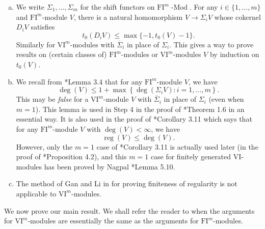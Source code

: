 \documentclass{amsart}
\numberwithin{equation}{section}
\DeclareMathOperator{\reg}{reg}
\DeclareMathOperator{\Mod}{-Mod}
\newcommand{\VI}{{\mathrm{VI}}}
\newcommand{\FI}{{\mathrm{FI}}}
\newcommand{\SSigma}{{\overline{\Sigma}}}
\begin{document}
\begin{remark} \label{rem: pf in gta}
   \begin{enumerate}[(a)]
      \item We write $\Sigma_1, \ldots, \Sigma_m$ for the shift functors on $\FI^m\Mod$. For any $i\in \{1, \ldots, m\}$ and $\FI^m$-module $V$, there is a natural homomorphism $V\to \Sigma_i V$ whose cokernel $D_i V$ satisfies 
      \[ t_0(D_i V)\leqslant \max\{-1, t_0(V)-1\}. \] 
      Similarly for $\VI^m$-modules with $\SSigma_i$ in place of $\Sigma_i$. This gives a way to prove results on (certain classes of) $\FI^m$-modules or $\VI^m$-modules $V$ by induction on $t_0(V)$. 

      \item We recall from \cite{gta}*{Lemma 3.4} that for any $\FI^m$-module $V$, we have 
      \[ \deg(V) \leqslant 1 + \max\left\{\deg(\Sigma_i V) : i=1, \ldots, m\right\}. \]  
      This may be \emph{false} for a $\VI^m$-module $V$ with $\SSigma_i$ in place of $\Sigma_i$ (even when $m=1$). This lemma is used in Step 4 in the proof of \cite{gta}*{Theorem 1.6} in an essential way. It is also used in the proof of \cite{gta}*{Corollary 3.11} which says that for any $\FI^m$-module $V$ with $\deg(V)<\infty$, we have 
      \[ \reg(V)\leqslant \deg(V). \] 
      However, only the $m=1$ case of \cite{gta}*{Corollary 3.11} is actually used later (in the proof of \cite{gta}*{Proposition 4.2}), and this $m=1$ case for finitely generated $\VI$-modules has been proved by Nagpal \cite{na}*{Lemma 5.10}. 

      \item The method of Gan and Li in \cite{gl_product} for proving finiteness of regularity is not applicable to $\VI^m$-modules.
   \end{enumerate}
\end{remark}


We now prove our main result. We shall refer the reader to \cite{gta} when the arguments for $\VI^m$-modules are essentially the same as the arguments for $\FI^m$-modules.
\end{document}
